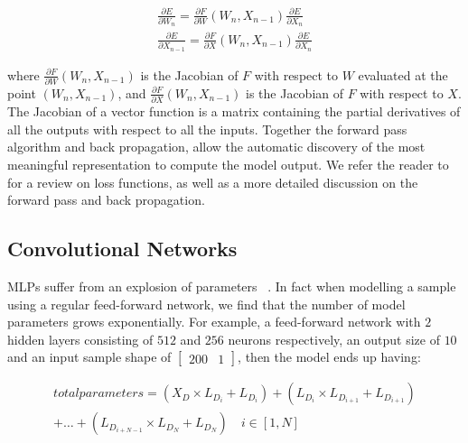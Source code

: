 \begin{subequations}
	\begin{gather}
		\frac{\partial E} {\partial W_n} = \frac{\partial F} {\partial W}(W_n, X_{n-1})\frac{\partial E} {\partial X_n} \\
		\frac{\partial E} {\partial X_{n-1}} = \frac{\partial F} {\partial X}(W_n, X_{n-1})\frac{\partial E} {\partial X_n} 
	\end{gather}
\end{subequations}

where $\frac{\partial F} {\partial W}(W_n, X_{n-1})$ is the Jacobian of $F$ with respect to $W$ evaluated at the point $(W_n, X_{n-1})$, and  $\frac{\partial F} {\partial X}(W_n, X_{n-1})$ is the Jacobian of $F$ with respect to $X$. The Jacobian of a vector function is a matrix containing the partial derivatives of all the outputs with respect to all the inputs. Together the forward pass algorithm and back propagation, allow the automatic discovery of the most meaningful representation to compute the model output. We refer the reader to ~\citep{Goodfellow-et-al-2016} for a review on loss functions, as well as a more detailed discussion on the forward pass and back propagation. 


\subsection{Convolutional Networks}

MLPs suffer from an explosion of parameters  ~\citep{krizhevsky2012imagenet}. In fact when modelling a sample using a regular feed-forward network, we find that the number of model parameters grows exponentially. For example, a feed-forward network with $2$ hidden layers consisting of $512$ and $256$ neurons respectively, an output size of $10$ and an input sample shape of $\left [ \begin{matrix} 200 & 1 \end{matrix} \right] $, then the model ends up having: 


\begin{multline}
		total parameters = (X_D \times L_{D_i} + L_{D_i}) + (L_{D_i} \times L_{D_{i+1}} + L_{D_{i+1}}) \\ 
		+ \dots + (L_{D_{i+N-1}} \times L_{D_{N}} + L_{D_{N}}) \quad i \in [1, N]
\end{multline}

